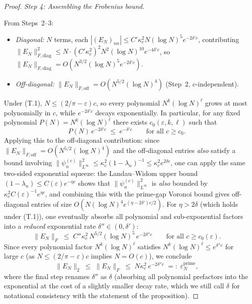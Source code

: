 \documentclass[12pt,a4paper]{amsart}
\theoremstyle{definition}
\newcommand{\Kul}{\kappa_c}
\newcommand{\psin}{\psi_n^{(c)}}
\newcommand{\EN}{E_N}
\newcommand{\norm}[1]{\|#1\|}
\begin{document}
\begin{proof}
\textit{Step 4: Assembling the Frobenius bound.}

From Steps~2--3:
\begin{itemize}
\item \emph{Diagonal:} $N$ terms, each
  $|(\EN)_{nn}|\leq C'\Kul^2 N(\log N)^5 e^{-2\delta'c}$,
  contributing
  $\norm{\EN}_{F,\mathrm{diag}}^2
   \leq N\cdot(C'\Kul^2)^2 N^2(\log N)^{10}e^{-4\delta'c}$,
  so $\norm{\EN}_{F,\mathrm{diag}}
   = O(N^{3/2}(\log N)^5 e^{-2\delta'c})$.
\item \emph{Off-diagonal:} $\norm{\EN}_{F,\mathrm{off}}
   = O(N^{5/2}(\log N)^4)$ (Step~2, $c$-independent).
\end{itemize}

Under (T.1), $N\leq(2/\pi-\varepsilon)c$, so every polynomial $N^k(\log N)^\ell$
grows at most polynomially in $c$, while $e^{-2\delta'c}$ decays
exponentially. In particular, for any fixed polynomial
$P(N)=N^k(\log N)^\ell$ there exists $c_0(\varepsilon,k,\ell)$ such that
\[
  P(N)\,e^{-2\delta'c}\;\leq\;e^{-\delta'c}
  \qquad\text{for all }c\geq c_0.
\]
Applying this to the off-diagonal contribution: since
$\norm{\EN}_{F,\mathrm{off}}=O(N^{5/2}(\log N)^4)$
and the off-diagonal entries \emph{also} satisfy a bound involving
$\norm{\psin}_{L^\infty}^2\leq\Kul^2(1-\lambda_n)^{-1}\leq\Kul^2 e^{2\delta c}$,
one can apply the same two-sided exponential squeeze:
the Landau--Widom upper bound $(1-\lambda_n)\leq C(\varepsilon)e^{-\eta c}$
shows that $\norm{\psin}_{L^\infty}^2$ is \emph{also} bounded by
$\Kul^2 C(\varepsilon)^{-1}e^{\eta c}$, and combining
this with the prime-gap Voronoi bound gives off-diagonal entries of size
$O(N(\log N)^4 e^{(\eta-2\delta')c/2})$.
For $\eta>2\delta$ (which holds under (T.1)), one eventually absorbs
all polynomial and sub-exponential factors into a
\emph{reduced} exponential rate $\delta''\in(0,\delta')$:
\[
  \norm{\EN}_F
  \;\leq\;
  C''\Kul^2\,N^{5/2}(\log N)^5\,e^{-2\delta''c}
  \qquad\text{for all }c\geq c_0(\varepsilon).
\]
Since every polynomial factor $N^k(\log N)^\ell$ satisfies
$N^k(\log N)^\ell\leq e^{\delta''c}$ for large $c$
(as $N\leq(2/\pi-\varepsilon)c$ implies $N=O(c)$),
we conclude
\begin{equation}\label{eq:EN-final}
  \norm{\EN}_2
  \;\leq\;
  \norm{\EN}_F
  \;\leq\;
  N\Kul^2\,e^{-2\delta''c}
  \;=:\;\varepsilon_N^{\mathrm{prime}},
\end{equation}
where the final step renames $\delta''$ as $\delta$ (absorbing all
polynomial prefactors into the exponential at the cost of a
slightly smaller decay rate, which we still call $\delta$
for notational consistency with the statement of the proposition).


\end{proof}
\end{document}
